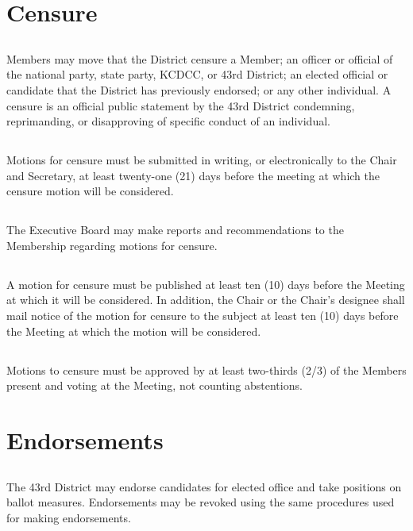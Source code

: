 \documentclass{article}
\newcommand{\fortythird}{\nth{43}}
\newcommand{\district}{\fortythird{} District}
\newcommand{\thedistrict}{the \district{}}
\begin{document}
\section{Censure}
\subsection{}
Members may move that \thedistrict{} censure a Member; an officer or official of the national party, state party, KCDCC, or 43rd District; an elected official or candidate that \thedistrict{} has previously endorsed; or any other individual. A censure is an official public statement by the 43rd District condemning, reprimanding, or disapproving of specific conduct of an individual.

\subsection{}
Motions for censure must be submitted in writing, or electronically to the Chair and Secretary, at least twenty-one (21) days before the meeting at which the censure motion will be considered.

\subsection{}
The Executive Board may make reports and recommendations to the Membership regarding motions for censure.

\subsection{}
A motion for censure must be published at least ten (10) days before the Meeting at which it will be considered. In addition, the Chair or the Chair’s designee shall mail notice of the motion for censure to the subject at least ten (10) days before the Meeting at which the motion will be considered.

\subsection{}
Motions to censure must be approved by at least two-thirds (2/3) of the Members present and voting at the Meeting, not counting abstentions.

\section{Endorsements}
\subsection{}
The 43rd District may endorse candidates for elected office and take positions on ballot measures.  Endorsements may be revoked using the same procedures used for making endorsements.
\end{document}
